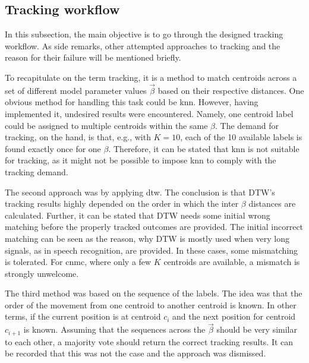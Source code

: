 \subsection{Tracking workflow}
\label{subsec_2_3_1_Tracking_Workflow}
In this subsection, the main objective is to go through the designed tracking workflow. As side remarks, other attempted approaches to tracking and the reason for their failure will be mentioned briefly.\newline


To recapitulate on the term tracking, it is a method to match centroids across a set of different model parameter values $\vec{\beta}$ based on their respective distances. One obvious method for handling this task could be \gls{knn}. However, having implemented it, undesired results were encountered. 
Namely, one centroid label could be assigned to multiple centroids within the same $\beta$. The demand for tracking, on the hand, is that, e.g., with $K=10$, each of the 10 available labels is found exactly once for one $\beta $. 
Therefore, it can be stated that \gls{knn} is not suitable for tracking, as it might not be possible to impose \gls{knn} to comply with the tracking demand.\newline

The second approach was by applying \gls{dtw}. The conclusion is that DTW's tracking results highly depended on the order in which the inter $\beta $ distances are calculated. Further, it can be stated that DTW needs some initial wrong matching before the properly tracked outcomes are provided. 
The initial incorrect matching can be seen as the reason, why DTW is mostly used when very long signals, as in speech recognition, are provided.
In these cases, some mismatching is tolerated. For \gls{cnmc}, where only a few $K$ centroids are available, a mismatch is strongly unwelcome.\newline

The third method was based on the sequence of the labels. 
The idea was that the order of the movement from one centroid to another centroid is known. In other terms, if the current position is at centroid $c_i$ and the next position for centroid $c_{i+1}$ is known. Assuming that the sequences across the $\vec{\beta}$ should be very similar to each other, a majority vote should return the correct tracking results. It can be recorded that this was not the case and the approach was dismissed.\newline

